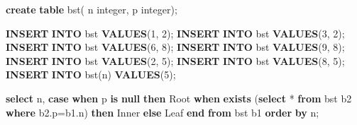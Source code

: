 \documentclass[
]{article}
\newenvironment{Shaded}{}{}
\newcommand{\ControlFlowTok}[1]{\textcolor[rgb]{0.00,0.44,0.13}{\textbf{#1}}}
\newcommand{\DataTypeTok}[1]{\textcolor[rgb]{0.56,0.13,0.00}{#1}}
\newcommand{\DecValTok}[1]{\textcolor[rgb]{0.25,0.63,0.44}{#1}}
\newcommand{\KeywordTok}[1]{\textcolor[rgb]{0.00,0.44,0.13}{\textbf{#1}}}
\newcommand{\NormalTok}[1]{#1}
\newcommand{\OperatorTok}[1]{\textcolor[rgb]{0.40,0.40,0.40}{#1}}
\newcommand{\StringTok}[1]{\textcolor[rgb]{0.25,0.44,0.63}{#1}}
\begin{document}
\begin{Shaded}
\begin{Highlighting}[]
\KeywordTok{create} \KeywordTok{table}\NormalTok{ bst(}
\NormalTok{n }\DataTypeTok{integer}\NormalTok{,}
\NormalTok{p }\DataTypeTok{integer}\NormalTok{);}

\KeywordTok{INSERT} \KeywordTok{INTO}\NormalTok{ bst }\KeywordTok{VALUES}\NormalTok{(}\DecValTok{1}\NormalTok{, }\DecValTok{2}\NormalTok{);}
\KeywordTok{INSERT} \KeywordTok{INTO}\NormalTok{ bst }\KeywordTok{VALUES}\NormalTok{(}\DecValTok{3}\NormalTok{, }\DecValTok{2}\NormalTok{);}
\KeywordTok{INSERT} \KeywordTok{INTO}\NormalTok{ bst }\KeywordTok{VALUES}\NormalTok{(}\DecValTok{6}\NormalTok{, }\DecValTok{8}\NormalTok{);}
\KeywordTok{INSERT} \KeywordTok{INTO}\NormalTok{ bst }\KeywordTok{VALUES}\NormalTok{(}\DecValTok{9}\NormalTok{, }\DecValTok{8}\NormalTok{);}
\KeywordTok{INSERT} \KeywordTok{INTO}\NormalTok{ bst }\KeywordTok{VALUES}\NormalTok{(}\DecValTok{2}\NormalTok{, }\DecValTok{5}\NormalTok{);}
\KeywordTok{INSERT} \KeywordTok{INTO}\NormalTok{ bst }\KeywordTok{VALUES}\NormalTok{(}\DecValTok{8}\NormalTok{, }\DecValTok{5}\NormalTok{);}
\KeywordTok{INSERT} \KeywordTok{INTO}\NormalTok{ bst(n) }\KeywordTok{VALUES}\NormalTok{(}\DecValTok{5}\NormalTok{);}

\KeywordTok{select}\NormalTok{ n, }\ControlFlowTok{case}
\ControlFlowTok{when}\NormalTok{ p }\KeywordTok{is} \KeywordTok{null} \ControlFlowTok{then} \StringTok{\textquotesingle{}Root\textquotesingle{}}
\ControlFlowTok{when} \KeywordTok{exists}\NormalTok{ (}\KeywordTok{select} \OperatorTok{*} \KeywordTok{from}\NormalTok{ bst b2 }\KeywordTok{where}\NormalTok{ b2.p}\OperatorTok{=}\NormalTok{b1.n) }\ControlFlowTok{then} \StringTok{\textquotesingle{}Inner\textquotesingle{}}
\ControlFlowTok{else} \StringTok{\textquotesingle{}Leaf\textquotesingle{}}
\ControlFlowTok{end}
\KeywordTok{from}\NormalTok{ bst b1 }\KeywordTok{order} \KeywordTok{by}\NormalTok{ n;}
\end{Highlighting}
\end{Shaded}
\end{document}
